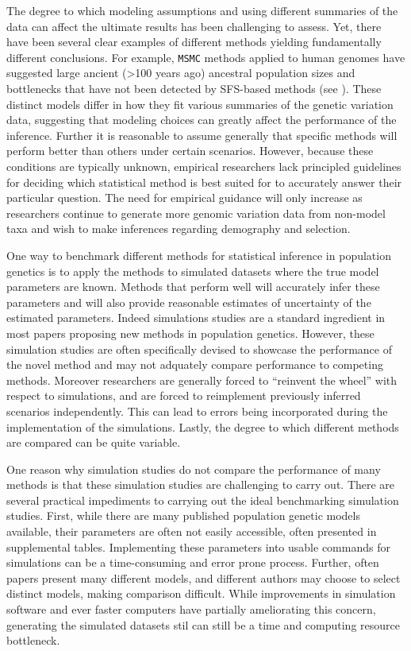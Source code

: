 \documentclass[12pt,halfline,a4paper]{ouparticle}
\newcommand{\MSMC}{\texttt{MSMC} }
\begin{document}
The degree to which modeling assumptions and using different summaries of the
data can affect the ultimate results has been challenging to assess. Yet, there
have been several clear examples of different methods yielding fundamentally
different conclusions. For example, \MSMC methods applied to human genomes have
suggested large ancient (>100 years ago) ancestral population sizes and
bottlenecks that have not been detected by SFS-based methods (see
\cite{beichman2017comparison}). These distinct models differ in how they fit various summaries of the
genetic variation data, suggesting that modeling choices can greatly affect the
performance of the inference. Further it is reasonable
to assume generally that specific methods will perform better than others under certain scenarios.
However, because these conditions are typically unknown, empirical researchers
lack principled guidelines for deciding which statistical method is best suited
for to accurately answer their particular question. The need for empirical
guidance will only increase as researchers continue to generate more genomic
variation data from non-model taxa and wish to make inferences regarding
demography and selection.

One way to benchmark different methods for statistical inference in population
genetics is to apply the methods to simulated datasets where the true model
parameters are known. Methods that perform well will accurately infer these
parameters and will also provide reasonable estimates of uncertainty of the
estimated parameters. Indeed simulations studies are a standard ingredient in
most papers proposing new methods in population genetics. However, these
simulation studies are often specifically devised to showcase the performance
of the novel method and may not adquately compare performance to competing
methods. Moreover researchers are generally forced to ``reinvent the wheel''
with respect to simulations, and are forced to reimplement previously
inferred scenarios independently. This can lead to errors being incorporated
during the implementation of the simulations. Lastly, the degree to
which different methods are compared can be quite variable.

One reason why simulation studies do not compare the performance of many methods
is that these simulation studies are challenging to carry out. There are several
practical impediments to carrying out the ideal benchmarking simulation studies.
First, while there are many published population genetic models available, their
parameters are often not easily accessible, often presented in supplemental
tables. Implementing these parameters into usable commands for simulations can
be a time-consuming and error prone process. Further, often papers present many
different models, and different authors may choose to select distinct models,
making comparison difficult. While improvements in simulation software and ever
faster computers have partially ameliorating this concern, generating the
simulated datasets stil can still be a time and computing resource bottleneck.
\end{document}
